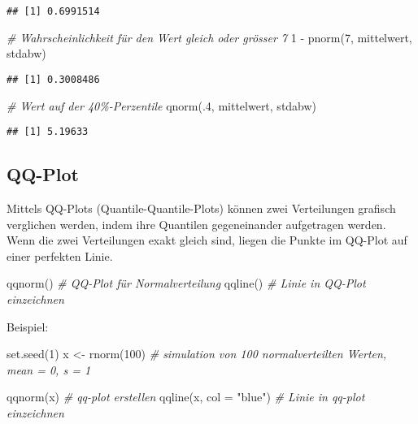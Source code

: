 \documentclass[
]{book}
\newenvironment{Shaded}{\begin{snugshade}}{\end{snugshade}}
\newcommand{\AttributeTok}[1]{\textcolor[rgb]{0.77,0.63,0.00}{#1}}
\newcommand{\CommentTok}[1]{\textcolor[rgb]{0.56,0.35,0.01}{\textit{#1}}}
\newcommand{\DecValTok}[1]{\textcolor[rgb]{0.00,0.00,0.81}{#1}}
\newcommand{\FunctionTok}[1]{\textcolor[rgb]{0.00,0.00,0.00}{#1}}
\newcommand{\NormalTok}[1]{#1}
\newcommand{\OtherTok}[1]{\textcolor[rgb]{0.56,0.35,0.01}{#1}}
\newcommand{\SpecialCharTok}[1]{\textcolor[rgb]{0.00,0.00,0.00}{#1}}
\newcommand{\StringTok}[1]{\textcolor[rgb]{0.31,0.60,0.02}{#1}}
\begin{document}
\begin{verbatim}
## [1] 0.6991514
\end{verbatim}

\begin{Shaded}
\begin{Highlighting}[]
\CommentTok{\# Wahrscheinlichkeit für den Wert gleich oder grösser 7}
\DecValTok{1} \SpecialCharTok{{-}} \FunctionTok{pnorm}\NormalTok{(}\DecValTok{7}\NormalTok{, mittelwert, stdabw)}
\end{Highlighting}
\end{Shaded}

\begin{verbatim}
## [1] 0.3008486
\end{verbatim}

\begin{Shaded}
\begin{Highlighting}[]
\CommentTok{\# Wert auf der 40\%{-}Perzentile}
\FunctionTok{qnorm}\NormalTok{(.}\DecValTok{4}\NormalTok{, mittelwert, stdabw)}
\end{Highlighting}
\end{Shaded}

\begin{verbatim}
## [1] 5.19633
\end{verbatim}

\hypertarget{qq-plot}{%
\subsection{QQ-Plot}\label{qq-plot}}

Mittels QQ-Plots (Quantile-Quantile-Plots) können zwei Verteilungen grafisch verglichen werden, indem ihre Quantilen gegeneinander aufgetragen werden. Wenn die zwei Verteilungen exakt gleich sind, liegen die Punkte im QQ-Plot auf einer perfekten Linie.

\begin{Shaded}
\begin{Highlighting}[]
\FunctionTok{qqnorm}\NormalTok{()    }\CommentTok{\# QQ{-}Plot für Normalverteilung}
\FunctionTok{qqline}\NormalTok{()    }\CommentTok{\# Linie in QQ{-}Plot einzeichnen}
\end{Highlighting}
\end{Shaded}

Beispiel:

\begin{Shaded}
\begin{Highlighting}[]
\FunctionTok{set.seed}\NormalTok{(}\DecValTok{1}\NormalTok{)}
\NormalTok{x }\OtherTok{\textless{}{-}} \FunctionTok{rnorm}\NormalTok{(}\DecValTok{100}\NormalTok{)         }\CommentTok{\# simulation von 100 normalverteilten Werten, mean = 0, s = 1}

\FunctionTok{qqnorm}\NormalTok{(x)               }\CommentTok{\# qq{-}plot erstellen}
\FunctionTok{qqline}\NormalTok{(x, }\AttributeTok{col =} \StringTok{"blue"}\NormalTok{) }\CommentTok{\# Linie in qq{-}plot einzeichnen}
\end{Highlighting}
\end{Shaded}
\end{document}
